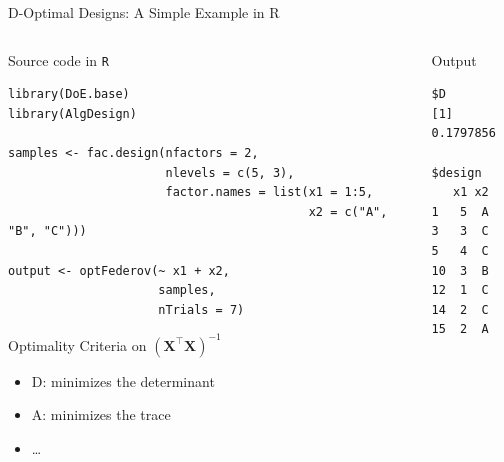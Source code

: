 \documentclass[10pt, compress, aspectratio=169, xcolor={table,usenames,dvipsnames}]{beamer}
\begin{document}
\begin{frame}[label={sec:org7308c76},fragile]{D-Optimal Designs: A Simple Example in R}
 \begin{columns}
\begin{column}{0.7\columnwidth}
\begin{block}{Source code in \texttt{R}}
\vspace{-.2cm}

\lstset{language=r,label= ,caption= ,captionpos=b,numbers=none}
\begin{lstlisting}
library(DoE.base)
library(AlgDesign)

samples <- fac.design(nfactors = 2,
                      nlevels = c(5, 3),
                      factor.names = list(x1 = 1:5,
                                          x2 = c("A", "B", "C")))

output <- optFederov(~ x1 + x2,
                     samples,
                     nTrials = 7)
\end{lstlisting}

\begin{block}{Optimality Criteria on \(\left(\bm{X}^{\intercal}\bm{X}\right)^{-1}\)}
\begin{itemize}
\item \alert{D}: minimizes the determinant
\item \alert{A}: minimizes the trace
\item \dots{}
\end{itemize}
\end{block}
\end{block}
\end{column}


\begin{column}{0.3\columnwidth}
\begin{block}{Output}
\vspace{-.2cm}
\scriptsize

\begin{verbatim}
$D
[1] 0.1797856

$design
   x1 x2
1   5  A
3   3  C
5   4  C
10  3  B
12  1  C
14  2  C
15  2  A
\end{verbatim}


\normalsize
\end{block}
\end{column}
\end{columns}
\end{frame}
\end{document}
